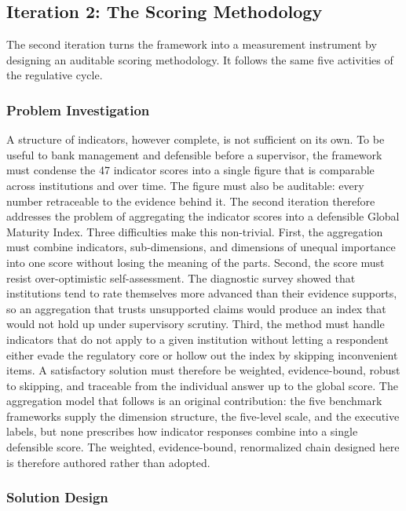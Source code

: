 \subsection{Iteration 2: The Scoring Methodology}

The second iteration turns the framework into a measurement instrument by designing an auditable scoring methodology. It follows the same five activities of the regulative cycle.

\subsubsection{Problem Investigation}

A structure of indicators, however complete, is not sufficient on its own. To be useful to bank management and defensible before a supervisor, the framework must condense the 47 indicator scores into a single figure that is comparable across institutions and over time. The figure must also be auditable: every number retraceable to the evidence behind it. The second iteration therefore addresses the problem of aggregating the indicator scores into a defensible Global Maturity Index. Three difficulties make this non-trivial. First, the aggregation must combine indicators, sub-dimensions, and dimensions of unequal importance into one score without losing the meaning of the parts. Second, the score must resist over-optimistic self-assessment. The diagnostic survey showed that institutions tend to rate themselves more advanced than their evidence supports, so an aggregation that trusts unsupported claims would produce an index that would not hold up under supervisory scrutiny. Third, the method must handle indicators that do not apply to a given institution without letting a respondent either evade the regulatory core or hollow out the index by skipping inconvenient items. A satisfactory solution must therefore be weighted, evidence-bound, robust to skipping, and traceable from the individual answer up to the global score. The aggregation model that follows is an original contribution: the five benchmark frameworks supply the dimension structure, the five-level scale, and the executive labels, but none prescribes how indicator responses combine into a single defensible score. The weighted, evidence-bound, renormalized chain designed here is therefore authored rather than adopted.

\subsubsection{Solution Design}

